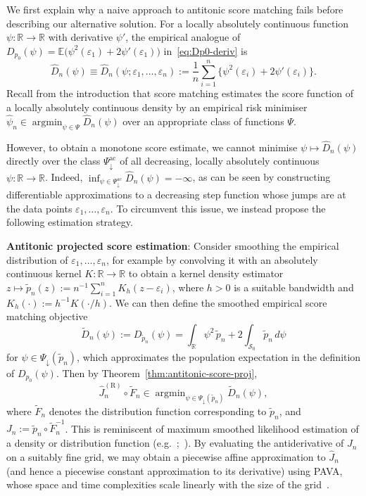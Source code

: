 \documentclass[a4paper]{article}
\newcommand{\R}{\mathbb{R}}
\newcommand{\E}{\mathbb{E}}
\DeclareMathOperator*{\argmin}{argmin}
\theoremstyle{definition}
\begin{document}
We first explain why a naive approach to antitonic score matching fails before describing our alternative solution. For a locally absolutely continuous function $\psi \colon \R \to \R$ with derivative $\psi'$, the empirical analogue of $D_{p_0}(\psi) = \E\bigl(\psi^2(\varepsilon_1) + 2\psi'(\varepsilon_1)\bigr)$ in~\eqref{eq:Dp0-deriv} is 
\begin{equation}
\label{eq:score-matching-empirical}
\hat{D}_n(\psi) \equiv \hat{D}_n(\psi; \varepsilon_1,\dotsc,\varepsilon_n) := \frac{1}{n}\sum_{i=1}^n \{\psi^2(\varepsilon_i) + 2\psi'(\varepsilon_i)\}. 
\end{equation}
Recall from the introduction that score matching estimates the score function of a locally absolutely continuous density by an empirical risk minimiser $\hat{\psi}_n \in \argmin_{\psi \in \Psi}\hat{D}_n(\psi)$ over an appropriate class of functions $\Psi$. 

However, to obtain a monotone score estimate, we cannot minimise $\psi \mapsto \hat{D}_n(\psi)$ directly over the class $\Psi_\downarrow^{\mathrm{ac}}$ of all decreasing, locally absolutely continuous $\psi \colon \R \to \R$. Indeed, $\inf_{\psi \in \Psi_\downarrow^{\mathrm{ac}}}\hat{D}_n(\psi) = -\infty$, as can be seen by constructing differentiable approximations to a decreasing step function whose jumps are at the data points $\varepsilon_1,\dotsc,\varepsilon_n$. To circumvent this issue, we instead propose the following estimation strategy.

\medskip
\noindent
\textbf{Antitonic projected score estimation}:
Consider smoothing the empirical distribution of $\varepsilon_1,\dotsc,\varepsilon_n$, for example by convolving it with an  absolutely continuous kernel $K \colon \R \to \R$ to obtain a kernel density estimator $z \mapsto \tilde{p}_n(z) := n^{-1}\sum_{i=1}^n K_h(z - \varepsilon_i)$, where $h > 0$ is a suitable bandwidth and $K_h(\cdot) := h^{-1}K(\cdot/h)$. We can then define the smoothed empirical score matching objective
\[
\tilde{D}_n(\psi) := D_{\tilde{p}_n}(\psi) = \int_\R \psi^2 \,\tilde{p}_n + 2\int_{\mathcal{S}_0} \tilde{p}_n\,d\psi
\]
for $\psi \in \Psi_\downarrow(\tilde{p}_n)$, which approximates the population expectation in the definition of $D_{p_0}(\psi)$. Then by Theorem~\ref{thm:antitonic-score-proj},
\begin{equation}
\label{eq:kernel-proj-score}
\hat{J}_n^{(\mathrm{R})} \circ \tilde{F}_n \in \argmin_{\psi \in \Psi_\downarrow(\tilde{p}_n)}\tilde{D}_n(\psi),
\end{equation}
where $\tilde{F}_n$ denotes the distribution function corresponding to $\tilde{p}_n$, and $J_n := \tilde{p}_n \circ \tilde{F}_n^{-1}$. This is reminiscent of maximum smoothed likelihood estimation of a density or distribution function (e.g.~\citealp{eggermont2000maximum};~\citealp[Sections~8.2 and~8.5]{groeneboom14nonparametric}). By evaluating the antiderivative of $J_n$ on a suitably fine grid, we may obtain a piecewise affine approximation to $\hat{J}_n$ (and hence a piecewise constant approximation to its derivative) using PAVA, whose space and time complexities scale linearly with the size of the grid~\citep[Section~9.3.1]{samworth24modern}. 
\end{document}
